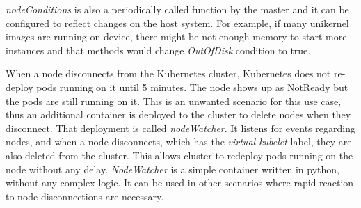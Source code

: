 \textit{nodeConditions} is also a periodically called function by the master and it can be configured to reflect changes on the host system. For example, if many unikernel images are running on device, there might be not enough memory to start more instances and that methods would change \textit{OutOfDisk} condition to true.

When a node disconnects from the Kubernetes cluster, Kubernetes does not re-deploy pods running on it until 5 minutes. The node shows up as NotReady but the pods are still running on it. This is an unwanted scenario for this use case, thus an additional container is deployed to the cluster to delete nodes when they disconnect. That deployment is called \textit{nodeWatcher}. It listens for events regarding nodes, and when a node disconnects, which has the \textit{virtual-kubelet} label, they are also deleted from the cluster. This allows cluster to redeploy pods running on the node without any delay. \textit{NodeWatcher} is a simple container written in python, without any complex logic. It can be used in other scenarios where rapid reaction to node disconnections are necessary.